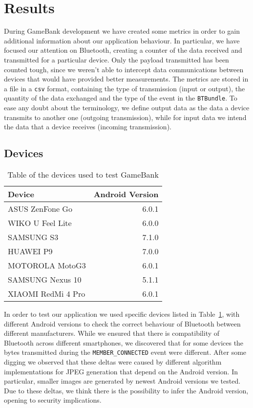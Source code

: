 \section{Results}
\label{results}

During GameBank development we have created some metrics in order to gain 
additional information about our application behaviour. In particular, we 
have focused our attention on Bluetooth, creating a counter of the data 
received and transmitted for a particular device. Only the payload transmitted 
has been counted tough, since we weren't able to intercept data communications 
between devices that would have provided better measurements. The metrics are 
stored in a file in a \texttt{csv} format, containing the type of transmission 
(input or output), the quantity of the data exchanged and the type of the 
event in the \texttt{BTBundle}. To ease any doubt about the terminology, we 
define output data as the data a device transmits to another one (outgoing 
transmission), while for input data we intend the data that a device receives 
(incoming transmission).

\subsection{Devices}

\begin{table}[t]
 \centering
 \caption{Table of the devices used to test GameBank}
 \label{tab:res:lod}
 \begin{tabular}{l r}
  \textbf{Device} & \textbf{Android Version} \\ \toprule
  ASUS ZenFone Go & 6.0.1 \\
  WIKO U Feel Lite & 6.0.0 \\
  SAMSUNG S3 & 7.1.0 \\
  HUAWEI P9 & 7.0.0 \\
  MOTOROLA MotoG3 & 6.0.1 \\
  SAMSUNG Nexus 10 & 5.1.1 \\
  XIAOMI RedMi 4 Pro & 6.0.1
 \end{tabular}
\end{table}

In order to test our application we used specific devices listed in 
Table~\ref{tab:res:lod}, with different Android versions to check the correct 
behaviour of Bluetooth between different manufacturers. While we ensured that 
there is compatibility of Bluetooth across different smartphones, we discovered 
that for some devices the bytes transmitted during the 
\texttt{MEMBER\_CONNECTED} event were different. After some digging we observed 
that these deltas were caused by different algorithm implementations for JPEG 
generation that depend on the Android version. In particular, smaller images 
are generated by newest Android versions we tested. Due to these deltas, we 
think there is the possibility to infer the Android version, opening to security 
implications.

